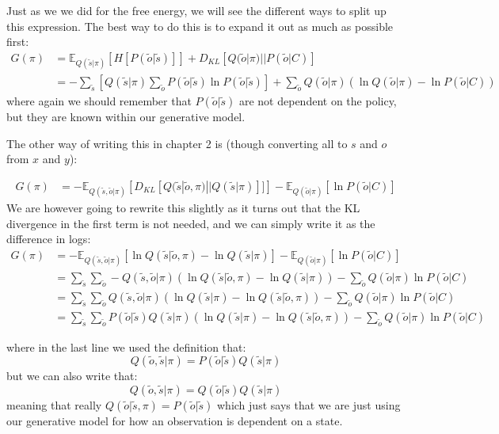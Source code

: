 \documentclass[11pt,oneside]{memoir}
\begin{document}
Just as we we did for the free energy, we will see the different ways to split up this expression. The best way to do this is to expand it out as much as possible first:
\begin{align}
G(\pi)&=\mathbb{E}_{Q(\tilde{s}|\pi)}\left[H\left[P(\tilde{o}|\tilde{s})\right]\right]+D_{KL}\left[Q(\tilde{o}|\pi)||P(\tilde{o}|C)\right]\\
&=-\sum_{\tilde{s}}\left[Q(\tilde{s}|\pi)\sum_{\tilde{o}}P(\tilde{o}|\tilde{s})\ln P(\tilde{o}|\tilde{s})\right]+\sum_{\tilde{o}}Q(\tilde{o}|\pi)\left(\ln Q(\tilde{o}|\pi)-\ln P(\tilde{o}|C)\right)\label{ambrisk}
\end{align}
where again we should remember that $P(\tilde{o}|\tilde{s})$ are not dependent on the policy, but they are known within our generative model.

The other way of writing this in chapter 2 is (though converting all to $s$ and $o$ from $x$ and $y$):

\begin{align}
G(\pi)&=-\mathbb{E}_{Q(\tilde{s},\tilde{o}|\pi)}\left[D_{KL}[Q(\tilde{s}|\tilde{o},\pi)||Q(\tilde{s}|\pi)]]\right]-\mathbb{E}_{Q(\tilde{o}|\pi)}\left[\ln P(\tilde{o}|C)\right]\label{secondGKL}
\end{align}
We are however going to rewrite this slightly as it turns out that the KL divergence in the first term is not needed, and we can simply write it as the difference in logs:
\begin{align}
G(\pi)&=-\mathbb{E}_{Q(\tilde{s},\tilde{o}|\pi)}\left[\ln Q(\tilde{s}|\tilde{o},\pi)-\ln Q(\tilde{s}|\pi)\right]-\mathbb{E}_{Q(\tilde{o}|\pi)}\left[\ln P(\tilde{o}|C)\right]\\
    &=\sum_{\tilde{s}}\sum_{\tilde{o}}-Q(\tilde{s},\tilde{o}|\pi)(\ln Q(\tilde{s}|\tilde{o},\pi)-\ln Q(\tilde{s}|\pi))-\sum_{\tilde{o}}Q(\tilde{o}|\pi)\ln P(\tilde{o}|C)\\&=
    \sum_{\tilde{s}}\sum_{\tilde{o}}Q(\tilde{s},\tilde{o}|\pi)(\ln Q(\tilde{s}|\pi)-\ln Q(\tilde{s}|\tilde{o},\pi))-\sum_{\tilde{o}}Q(\tilde{o}|\pi)\ln P(\tilde{o}|C)\\&=
    \sum_{\tilde{s}}\sum_{\tilde{o}}P(\tilde{o}|\tilde{s})Q(\tilde{s}|\pi)(\ln Q(\tilde{s}|\pi)-\ln Q(\tilde{s}|\tilde{o},\pi))-\sum_{\tilde{o}}Q(\tilde{o}|\pi)\ln P(\tilde{o}|C)\label{secondG}
\end{align}

where in the last line we used the definition that:
$$Q(\tilde{o},\tilde{s}|\pi)=P(\tilde{o}|\tilde{s})Q(\tilde{s}|\pi)$$
but we can also write that:
$$Q(\tilde{o},\tilde{s}|\pi)=Q(\tilde{o}|\tilde{s})Q(\tilde{s}|\pi)$$
meaning that really $Q(\tilde{o}|\tilde{s},\pi)=P(\tilde{o}|\tilde{s})$ which just says that we are just using our generative model for how an observation is dependent on a state.
\end{document}
